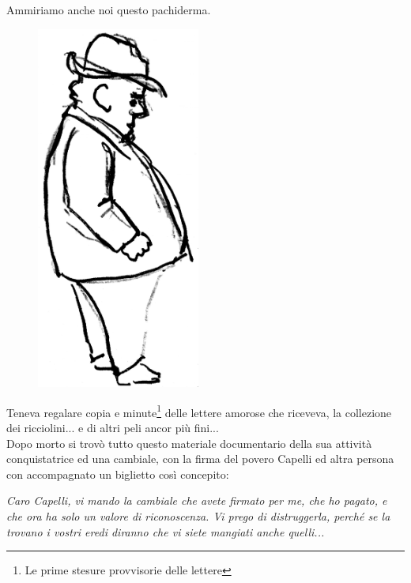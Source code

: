 \documentclass[10pt]{memoir} %
\begin{document}
\noindent Ammiriamo anche noi questo pachiderma.
 \begin{figure}[htb]
    \centering
    \includegraphics[height=12cm]{Capelli_mangione}
\end{figure}

\newpage
Teneva regalare copia e minute\footnote{Le prime stesure provvisorie delle lettere} delle lettere amorose che riceveva, la collezione dei ricciolini... e di altri peli ancor più fini...\\
Dopo morto si trovò tutto questo materiale documentario della sua attività conquistatrice ed una cambiale, con la firma del povero Capelli ed altra persona con accompagnato un biglietto così concepito:
\begin{center}
	\emph{Caro Capelli, vi mando la cambiale che avete firmato per me, che ho pagato, e che ora ha solo un valore di riconoscenza. Vi prego di distruggerla, perché se la trovano i vostri eredi diranno che vi siete mangiati anche quelli...}
\end{center}
\:
\:
\end{document}
